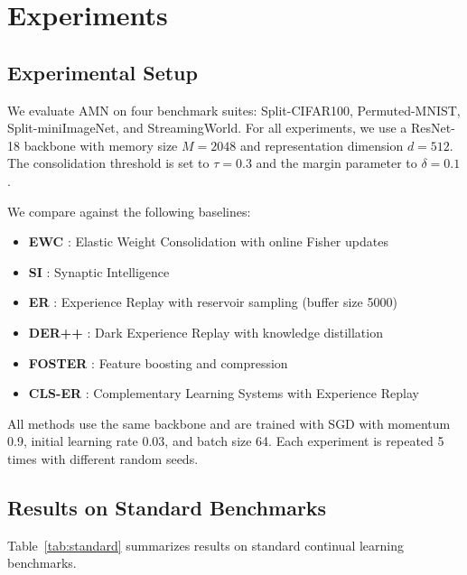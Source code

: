 \documentclass[11pt]{article}
\begin{document}
\section{Experiments}
\label{sec:experiments}

\subsection{Experimental Setup}

We evaluate AMN on four benchmark suites: Split-CIFAR100, Permuted-MNIST, Split-miniImageNet, and StreamingWorld. For all experiments, we use a ResNet-18 backbone with memory size $M = 2048$ and representation dimension $d = 512$. The consolidation threshold is set to $\tau = 0.3$ and the margin parameter to $\delta = 0.1$.

We compare against the following baselines:
\begin{itemize}
    \item \textbf{EWC} \citep{kirkpatrick2017overcoming}: Elastic Weight Consolidation with online Fisher updates
    \item \textbf{SI} \citep{zenke2017continual}: Synaptic Intelligence
    \item \textbf{ER} \citep{rolnick2019experience}: Experience Replay with reservoir sampling (buffer size 5000)
    \item \textbf{DER++} \citep{buzzega2020dark}: Dark Experience Replay with knowledge distillation
    \item \textbf{FOSTER} \citep{wang2022foster}: Feature boosting and compression
    \item \textbf{CLS-ER} \citep{arani2022learning}: Complementary Learning Systems with Experience Replay
\end{itemize}

All methods use the same backbone and are trained with SGD with momentum 0.9, initial learning rate 0.03, and batch size 64. Each experiment is repeated 5 times with different random seeds.

\subsection{Results on Standard Benchmarks}

Table~\ref{tab:standard} summarizes results on standard continual learning benchmarks.
\end{document}
